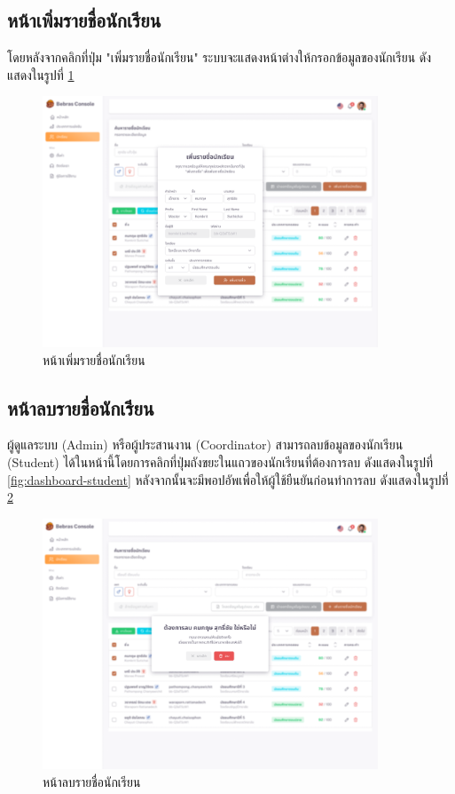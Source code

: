 \subsection{หน้าเพิ่มรายชื่อนักเรียน}

โดยหลังจากคลิกที่ปุ่ม "เพิ่มรายชื่อนักเรียน" ระบบจะแสดงหน้าต่างให้กรอกข้อมูลของนักเรียน ดังแสดงในรูปที่ \ref{fig:addStudent}

\begin{figure}[H]
    \centering
    \includegraphics[width=100mm,scale=1.0]{images/addStudent.png}
    \caption{หน้าเพิ่มรายชื่อนักเรียน}
    \label{fig:addStudent}
\end{figure}

\subsection{หน้าลบรายชื่อนักเรียน}

ผู้ดูแลระบบ (Admin) หรือผู้ประสานงาน (Coordinator) สามารถลบข้อมูลของนักเรียน (Student) ได้ในหน้านี้โดยการคลิกที่ปุ่มถังขยะในแถวของนักเรียนที่ต้องการลบ ดังแสดงในรูปที่ \ref{fig:dashboard-student} หลังจากนั้นจะมีพอปอัพเพื่อให้ผู้ใช้ยืนยันก่อนทำการลบ ดังแสดงในรูปที่ \ref{fig:remove-student}

\begin{figure}[H]
    \centering
    \includegraphics[width=100mm,scale=1.0]{images/deleteStudent.png}
    \caption{หน้าลบรายชื่อนักเรียน}
    \label{fig:remove-student}
\end{figure}

